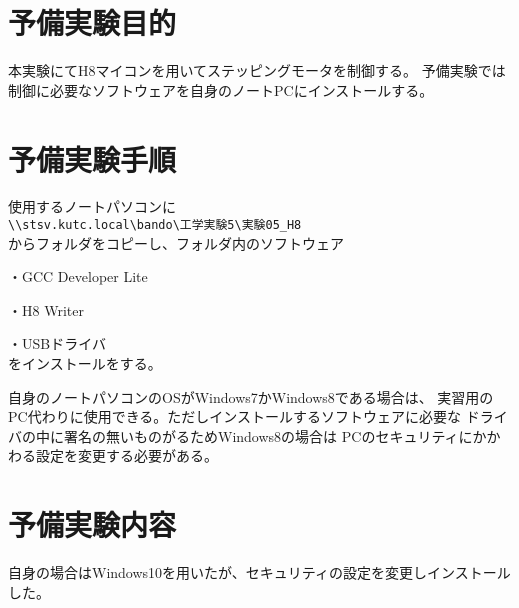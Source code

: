 \documentclass{jsarticle}
\begin{document}


\section{予備実験目的}
本実験にてH8マイコンを用いてステッピングモータを制御する。
予備実験では制御に必要なソフトウェアを自身のノートPCにインストールする。\par

\section{予備実験手順}
使用するノートパソコンに\\
\verb|\\stsv.kutc.local\bando\工学実験5\実験05_H8|\\
 からフォルダをコピーし、フォルダ内のソフトウェア\par
\setlength{\itemsep}{0.1pt}
\item ・GCC Developer Lite
\item ・H8 Writer
\item ・USBドライバ\\
をインストールをする。\par
自身のノートパソコンのOSがWindows7かWindows8である場合は、
実習用のPC代わりに使用できる。ただしインストールするソフトウェアに必要な
ドライバの中に署名の無いものがるためWindows8の場合は
PCのセキュリティにかかわる設定を変更する必要がある。\par

\section{予備実験内容}
自身の場合はWindows10を用いたが、セキュリティの設定を変更しインストールした。\par

\end{document}
